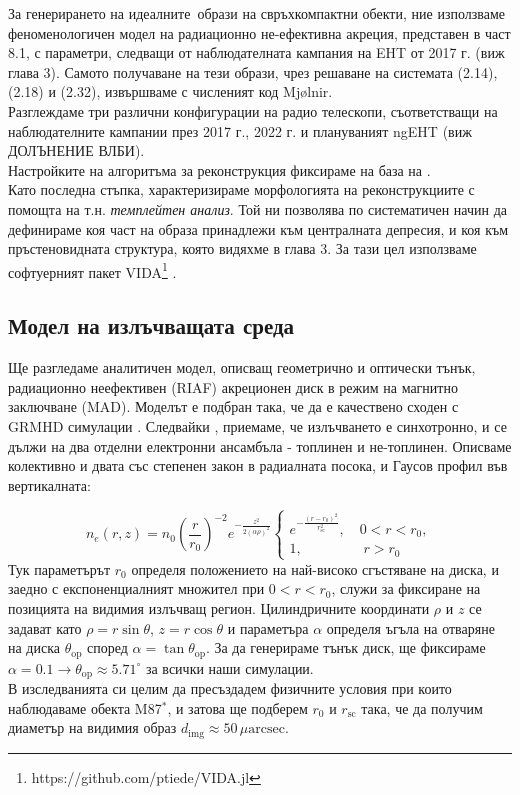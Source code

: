 За генерирането на идеалните$\,$ образи на свръхкомпактни обекти, ние използваме феноменологичен модел на радиационно не-ефективна акреция, представен в част 8.1, с параметри, следващи от наблюдателната кампания на EHT от 2017 г. (виж глава 3). Самото получаване на тези образи, чрез решаване на системата (2.14), (2.18) и (2.32), извършваме с численият код Mjølnir. \\

Разглеждаме три различни конфигурации на радио телескопи, съответстващи на наблюдателните кампании през 2017 г., 2022 г. и плануваният ngEHT (виж ДОЛЪНЕНИЕ ВЛБИ).\\

Настройките на алгоритъма за реконструкция фиксираме на база на \cite{EHTIM}.\\

Като последна стъпка, характеризираме морфологията на реконструкциите с помощта на т.н. \emph{темплейтен анализ}. Той ни позволява по систематичен начин да дефинираме коя част на образа принадлежи към централната депресия, и коя към пръстеновидната структура, която видяхме в глава 3. За тази цел използваме софтуерният пакет VIDA\footnote{https://github.com/ptiede/VIDA.jl} \cite{VIDA}.

\subsection{Модел на излъчващата среда}

Ще разгледаме аналитичен модел, описващ геометрично и оптически тънък, радиационно неефективен (RIAF) акреционен диск в режим на магнитно заключване (MAD). Моделът е подбран така, че да е качествено сходен с GRMHD симулации \cite{Yuan2003}. Следвайки \cite{Broderick2021}, \cite{Gold2020} приемаме, че излъчването е синхотронно, и се дължи на два отделни електронни ансамбъла - топлинен и не-топлинен. Описваме колективно и двата със степенен закон в радиалната посока, и Гаусов профил във вертикалната:

\begin{equation}
	n_e(r,z) = n_0\left(\frac{r}{r_0}\right)^{-2}e^{-\frac{z^2}{2(\alpha\rho)^2}}
	\begin{cases}
		e^{-\frac{(r-r_0)^2}{r^2_{\text{sc}}}},\quad 0 < r < r_0,\\
		1,\,\,\qquad\qquad r>r_0
	\end{cases}
\end{equation}
Тук параметърът $r_0$ определя положението на най-високо сгъстяване на диска, и заедно с експоненциалният множител при $0 < r < r_0$, служи за фиксиране на позицията на видимия излъчващ регион. Цилиндричните координати $\rho$ и $z$ се задават като $\rho = r\sin\theta$, $z = r\cos\theta$ и параметъра $\alpha$ определя ъгъла на отваряне на диска $\theta_{\text{op}}$ според $\alpha = \tan\theta_\text{op}$. За да генерираме тънък диск, ще фиксираме $\alpha = 0.1 \rightarrow \theta_{\text{op}}\approx 5.71^\circ$ за всички наши симулации.\\
В изследванията си целим да пресъздадем физичните условия при които наблюдаваме обекта M87$^*$, и затова ще подберем $r_0$ и $r_\text{sc}$ така, че да получим диаметър на видимия образ $d_\text{img}\approx 50\, \mu\text{arcsec}$.\\

